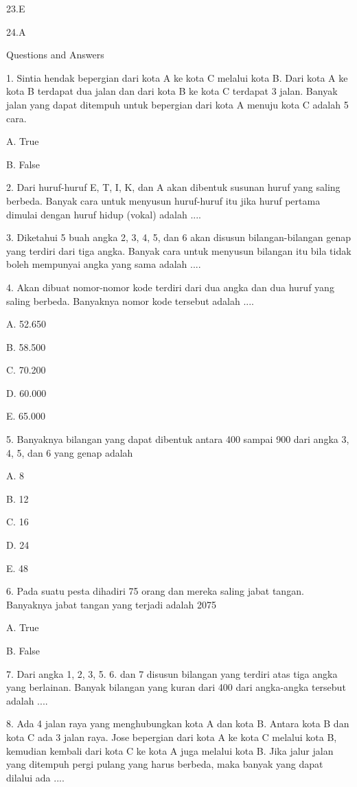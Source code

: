 \documentclass[11pt,fleqn]{book} %
\begin{document}
23.E

24.A





Questions and Answers




1. 
Sintia hendak bepergian dari kota A ke kota C melalui kota B. Dari kota A ke kota B terdapat dua jalan dan dari kota B ke kota C terdapat 3 jalan. Banyak jalan yang dapat ditempuh untuk bepergian dari kota A menuju kota C adalah 5 cara.

A. 
True

B. 
False

2. 
Dari huruf-huruf E, T, I, K, dan A akan dibentuk susunan huruf yang saling berbeda. Banyak cara untuk menyusun huruf-huruf itu jika huruf pertama dimulai dengan huruf hidup (vokal) adalah ....

3. 
Diketahui 5 buah angka 2, 3, 4, 5, dan 6 akan disusun bilangan-bilangan genap yang terdiri dari tiga angka. Banyak cara untuk menyusun bilangan itu bila tidak boleh mempunyai angka yang sama adalah ....

4. 
Akan dibuat nomor-nomor kode terdiri dari dua angka dan dua huruf yang saling berbeda. Banyaknya nomor kode tersebut adalah ....

A. 
52.650

B. 
58.500

C. 
70.200

D. 
60.000

E. 
65.000

5. 
Banyaknya bilangan yang dapat dibentuk antara 400 sampai 900 dari angka 3, 4, 5, dan 6 yang genap adalah

A. 
8

B. 
12

C. 
16

D. 
24

E. 
48

6. 
Pada suatu pesta dihadiri 75 orang dan mereka saling jabat tangan. Banyaknya jabat tangan yang terjadi adalah 2075

A. 
True

B. 
False

7. 
Dari angka 1, 2, 3, 5. 6. dan 7 disusun bilangan yang terdiri atas tiga angka yang berlainan. Banyak bilangan yang kuran dari 400 dari angka-angka tersebut adalah ....

8. 
Ada 4 jalan raya yang menghubungkan kota A dan kota B. Antara kota B dan kota C ada 3 jalan raya. Jose bepergian dari kota A ke kota C melalui kota B, kemudian kembali dari kota C ke kota A juga melalui kota B. Jika jalur jalan yang ditempuh pergi pulang yang harus berbeda, maka banyak yang dapat dilalui ada ....
\end{document}
